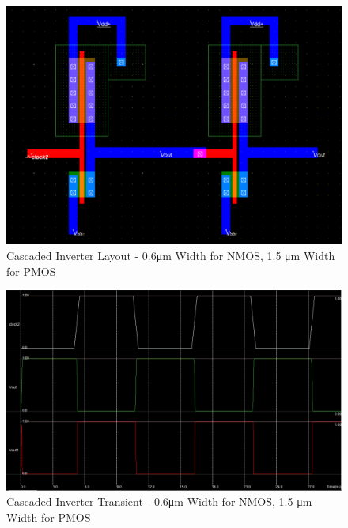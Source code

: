 \begin{figure}[h!]
	\centering
	\includegraphics[scale=0.50]{./images/cascaded_inverter_06nmos15pmos.PNG}
	\caption{Cascaded Inverter Layout - 0.6\si{\micro\meter} Width for NMOS, 1.5 \si{\micro\meter} Width for PMOS}
	\label{fig:cascaded_inverter_06nmos15pmos}
\end{figure}

\FloatBarrier

\FloatBarrier

\begin{figure}[h!]
	\centering
	\includegraphics[scale=0.50]{./images/cascaded_inverter_transient_06nmos15pmos.PNG}
	\caption{Cascaded Inverter Transient - 0.6\si{\micro\meter} Width for NMOS, 1.5 \si{\micro\meter} Width for PMOS}
	\label{fig:cascaded_inverter_transient_06nmos15pmos}
\end{figure}

\FloatBarrier

